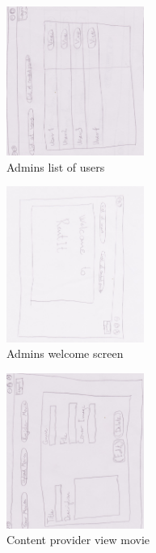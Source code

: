 \begin{figure}[!ht]
  \centering
    \includegraphics[angle=90, width=0.4\textwidth]{Parts/Appendix/Images/PaperMockup/AdminListOfUsers}
  \caption{Admins list of users}
  \label{fig:Appendix_GUI_sketches_AdminListofUsers}
\end{figure}
\begin{figure}[!ht]
  \centering
    \includegraphics[angle=90, width=0.4\textwidth]{Parts/Appendix/Images/PaperMockup/AdminWelcome}
  \caption{Admins welcome screen}
  \label{fig:Appendix_GUI_sketches_AdminWelcome}
\end{figure}
\begin{figure}[!ht]
  \centering
    \includegraphics[angle=90, width=0.4\textwidth]{Parts/Appendix/Images/PaperMockup/CPEditmovie}
  \caption{Content provider view movie}
  \label{fig:Appendix_GUI_sketches_ViewMovie}
\end{figure}
